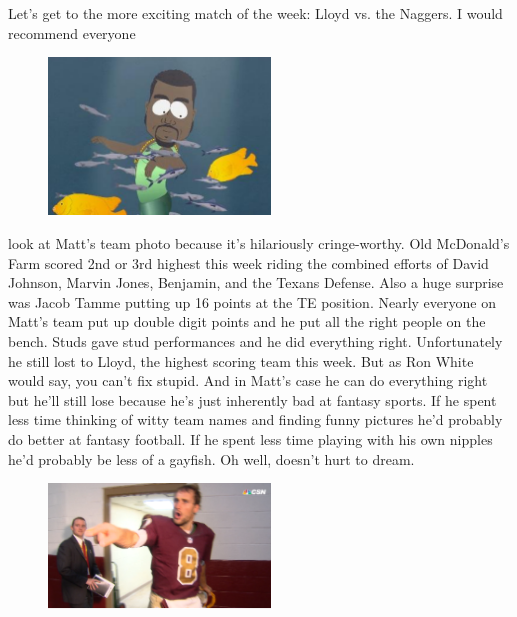 \documentclass[11pt,letterpaper]{article}
\begin{document}
\newpage
{}
Let's get to the more exciting match of the week: Lloyd vs. the Naggers. I would recommend everyone
\begin{figure}
\centering
\includegraphics[width=0.525\textwidth]{week2-kanye.png}
\label{fig:week2-kanye}
\end{figure} 
\par\noindent look at Matt's team photo because it's hilariously cringe-worthy. Old McDonald's Farm scored 2nd or 3rd highest this week riding the combined efforts of David Johnson, Marvin Jones, Benjamin, and the Texans Defense. Also a huge surprise was Jacob Tamme putting up 16 points at the TE position. Nearly everyone on Matt's team put up double digit points and he put all the right people on the bench. Studs gave stud performances and he did everything right. Unfortunately he still lost to Lloyd, the highest scoring team this week. But as Ron White would say, you can't fix stupid. And in Matt's case he can do everything right but he'll still lose because he's just inherently bad at fantasy sports. If he spent less time thinking of witty team names and finding funny pictures he'd probably do better at fantasy football.  If he spent less time playing with his own nipples he'd probably be less of a gayfish. Oh well, doesn't hurt to dream.
\begin{figure}
\centering
\includegraphics[width=0.525\textwidth]{week2-cousins.png}
\label{fig:week2-cousins}
\end{figure} 
\end{document}
